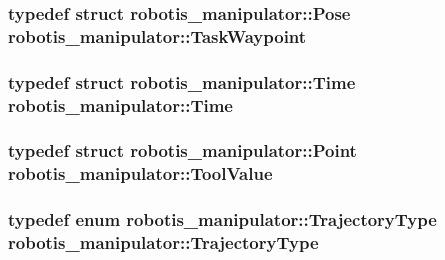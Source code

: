 \subsubsection[{\texorpdfstring{Task\+Waypoint}{TaskWaypoint}}]{\setlength{\rightskip}{0pt plus 5cm}typedef struct {\bf robotis\+\_\+manipulator\+::\+Pose}  {\bf robotis\+\_\+manipulator\+::\+Task\+Waypoint}}\hypertarget{namespacerobotis__manipulator_a440e2d88ec85fdee394e540dc6024c3e}{}\label{namespacerobotis__manipulator_a440e2d88ec85fdee394e540dc6024c3e}
\subsubsection[{\texorpdfstring{Time}{Time}}]{\setlength{\rightskip}{0pt plus 5cm}typedef struct {\bf robotis\+\_\+manipulator\+::\+Time}  {\bf robotis\+\_\+manipulator\+::\+Time}}\hypertarget{namespacerobotis__manipulator_a1a7fc2145859dfbfbb20910e5373b7db}{}\label{namespacerobotis__manipulator_a1a7fc2145859dfbfbb20910e5373b7db}
\subsubsection[{\texorpdfstring{Tool\+Value}{ToolValue}}]{\setlength{\rightskip}{0pt plus 5cm}typedef struct {\bf robotis\+\_\+manipulator\+::\+Point}  {\bf robotis\+\_\+manipulator\+::\+Tool\+Value}}\hypertarget{namespacerobotis__manipulator_a54e0b849e686b7c6271dbe01d6ba6ef6}{}\label{namespacerobotis__manipulator_a54e0b849e686b7c6271dbe01d6ba6ef6}
\subsubsection[{\texorpdfstring{Trajectory\+Type}{TrajectoryType}}]{\setlength{\rightskip}{0pt plus 5cm}typedef enum {\bf robotis\+\_\+manipulator\+::\+Trajectory\+Type}  {\bf robotis\+\_\+manipulator\+::\+Trajectory\+Type}}\hypertarget{namespacerobotis__manipulator_adfa0c5066de3b85b33d8998df78f8c0e}{}\label{namespacerobotis__manipulator_adfa0c5066de3b85b33d8998df78f8c0e}
